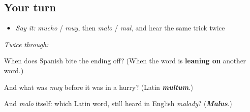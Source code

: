 \subsection*{Your turn}
\begin{itemize}
\raggedright
  \item \emph{Say it:} \emph{mucho} / \emph{muy}, then \emph{malo} / \emph{mal}, and hear the same trick twice
\end{itemize}

\emph{Twice through:}

\begin{tcolorbox}[breakable,colback=teal!4,colframe=teal!35!black,title={Before you move on}]
When does Spanish bite the ending off? (When the word is \textbf{leaning on} another word.)

And what was \emph{muy} before it was in a hurry? (Latin \emph{\textbf{multum}}.)

And \emph{malo} itself: which Latin word, still heard in English \emph{malady}? (\emph{\textbf{Malus}}.)
\end{tcolorbox}

